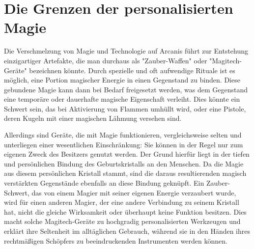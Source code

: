 \documentclass[10pt,a4paper,twocolumn,openany]{book}
\begin{document}
\section{Die Grenzen der personalisierten Magie}

Die Verschmelzung von Magie und Technologie auf Arcanis führt zur Entstehung einzigartiger Artefakte, die man durchaus als "Zauber-Waffen" oder "Magitech-Geräte" bezeichnen könnte. Durch spezielle und oft aufwendige Rituale ist es möglich, eine Portion magischer Energie in einen Gegenstand zu binden. Diese gebundene Magie kann dann bei Bedarf freigesetzt werden, was dem Gegenstand eine temporäre oder dauerhafte magische Eigenschaft verleiht. Dies könnte ein Schwert sein, das bei Aktivierung von Flammen umhüllt wird, oder eine Pistole, deren Kugeln mit einer magischen Lähmung versehen sind.

Allerdings sind Geräte, die mit Magie funktionieren, vergleichsweise selten und unterliegen einer wesentlichen Einschränkung: Sie können in der Regel nur zum eigenen Zweck des Besitzers genutzt werden. Der Grund hierfür liegt in der tiefen und persönlichen Bindung des Geburtskristalls an den Menschen. Da die Magie aus diesem persönlichen Kristall stammt, sind die daraus resultierenden magisch verstärkten Gegenstände ebenfalls an diese Bindung geknüpft. Ein Zauber-Schwert, das von einem Magier mit seiner eigenen Energie verzaubert wurde, wird für einen anderen Magier, der eine andere Verbindung zu seinem Kristall hat, nicht die gleiche Wirksamkeit oder überhaupt keine Funktion besitzen. Dies macht solche Magitech-Geräte zu hochgradig personalisierten Werkzeugen und erklärt ihre Seltenheit im alltäglichen Gebrauch, während sie in den Händen ihres rechtmäßigen Schöpfers zu beeindruckenden Instrumenten werden können.
\end{document}
